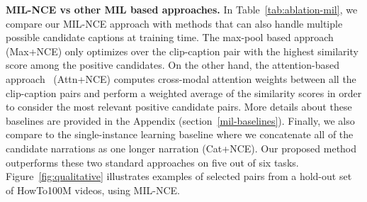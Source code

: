 \documentclass[10pt,twocolumn,letterpaper]{article}
\begin{document}
\noindent
\textbf{MIL-NCE vs other MIL based approaches.}
In Table~\ref{tab:ablation-mil}, we compare our MIL-NCE approach with methods that can also handle multiple possible candidate captions at training time.
The max-pool based approach~\cite{andrews2003support,arandjelovic2018objects,Oquab_2015_CVPR} (Max+NCE) only optimizes over the clip-caption pair with the highest similarity score among the positive candidates.
On the other hand, the attention-based approach~\cite{ilse2018attention} (Attn+NCE) computes cross-modal attention weights between all the clip-caption pairs and perform a weighted average of the similarity scores in order to consider the most relevant positive candidate pairs. 
More details about these baselines are provided in the Appendix (section~\ref{mil-baselines}).
Finally, we also compare to the single-instance learning baseline where we concatenate all of the candidate narrations as one longer narration (Cat+NCE).
Our proposed method outperforms these two standard approaches on five out of six tasks.
Figure~\ref{fig:qualitative} illustrates examples of selected pairs from a hold-out set of HowTo100M videos, using MIL-NCE.
\end{document}
